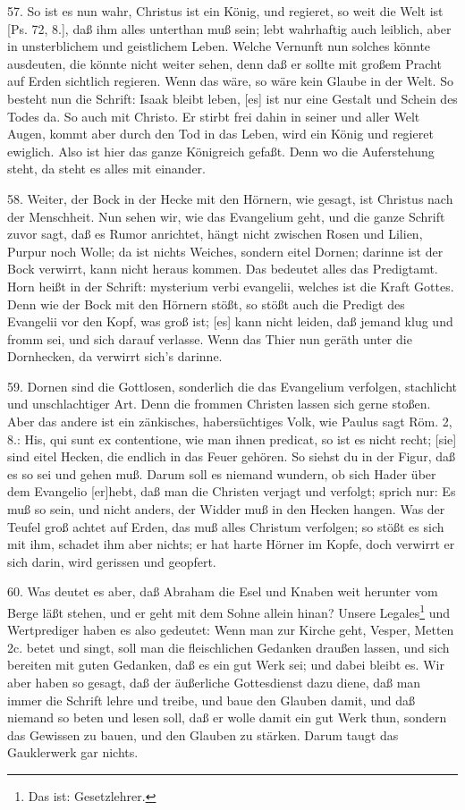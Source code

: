 57. So ist es nun wahr, Christus ist ein König, und regieret, so weit die Welt ist [Ps. 72, 8.], daß ihm alles unterthan muß sein; lebt wahrhaftig auch leiblich, aber in unsterblichem und geistlichem Leben. Welche Vernunft nun solches könnte ausdeuten, die könnte nicht weiter sehen, denn daß er sollte mit großem Pracht auf Erden sichtlich regieren. Wenn das wäre, so wäre kein Glaube in der Welt. So besteht nun die Schrift: Isaak bleibt leben, [es] ist nur eine Gestalt und Schein des Todes da. So auch mit Christo. Er stirbt frei dahin in seiner und aller Welt Augen, kommt aber durch den Tod in das Leben, wird ein König und regieret ewiglich. Also ist hier das ganze Königreich gefaßt. Denn wo die Auferstehung steht, da steht es alles mit einander.

58. Weiter, der Bock in der Hecke mit den Hörnern, wie gesagt, ist Christus nach der Menschheit. Nun sehen wir, wie das Evangelium geht, und die ganze Schrift zuvor sagt, daß es Rumor anrichtet, hängt nicht zwischen Rosen und Lilien, Purpur noch Wolle; da ist nichts Weiches, sondern eitel Dornen; darinne ist der Bock verwirrt, kann nicht heraus kommen. Das bedeutet alles das Predigtamt. Horn heißt in der Schrift: mysterium verbi evangelii, welches ist die Kraft Gottes. Denn wie der Bock mit den Hörnern stößt, so stößt auch die Predigt des Evangelii vor den Kopf, was groß ist; [es] kann nicht leiden, daß jemand klug und fromm sei, und sich darauf verlasse. Wenn das Thier nun geräth unter die Dornhecken, da verwirrt sich's darinne.

59. Dornen sind die Gottlosen, sonderlich die das Evangelium verfolgen, stachlicht und unschlachtiger
Art. Denn die frommen Christen lassen sich gerne stoßen. Aber das andere ist ein zänkisches, habersüchtiges Volk, wie Paulus sagt Röm. 2, 8.: His, qui sunt ex contentione, wie man ihnen predicat, so ist es nicht recht; [sie] sind eitel Hecken, die endlich in das Feuer gehören. So siehst du in der Figur, daß es so sei und gehen muß. Darum soll es niemand wundern, ob sich Hader über dem Evangelio [er]hebt, daß man die Christen verjagt und verfolgt; sprich nur: Es muß so sein, und nicht anders, der Widder muß in den Hecken hangen. Was der Teufel groß achtet auf Erden, das muß alles Christum verfolgen; so stößt es sich mit ihm, schadet ihm aber nichts; er hat harte Hörner im Kopfe, doch verwirrt er sich darin, wird gerissen und geopfert.

60. Was deutet es aber, daß Abraham die Esel und Knaben weit herunter vom Berge läßt stehen, und er geht mit dem Sohne allein hinan? Unsere Legales\footnote{Das ist: Gesetzlehrer.} und Wertprediger haben es also gedeutet: Wenn man zur Kirche geht, Vesper, Metten 2c. betet und singt, soll man die fleischlichen Gedanken draußen lassen, und sich bereiten mit guten Gedanken, daß es ein gut Werk sei; und dabei bleibt es. Wir aber haben so gesagt, daß der äußerliche Gottesdienst dazu diene, daß man immer die Schrift lehre und treibe, und baue den Glauben damit, und daß niemand so beten und lesen soll, daß er wolle damit ein gut Werk thun, sondern das Gewissen zu bauen, und den Glauben zu stärken. Darum taugt das Gauklerwerk gar nichts.

